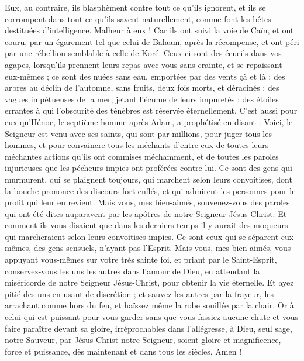 \begin{multicols}{2}
Eux, au contraire, ils blasphèment contre tout ce qu'ils ignorent, et ils se corrompent dans tout ce qu'ils savent naturellement, comme font les bêtes destituées d'intelligence.
Malheur à eux ! Car ils ont suivi la voie de Caïn, et ont couru, par un égarement tel que celui de Balaam, après la récompense, et ont péri par une rébellion semblable à celle de Koré.
Ceux-ci sont des écueils dans vos agapes, lorsqu’ils prennent leurs repas avec vous sans crainte, et se repaissant eux-mêmes ; ce sont des nuées sans eau, emportées par des vents çà et là ; des arbres au déclin de l’automne, sans fruits, deux fois morts, et déracinés ;
des vagues impétueuses de la mer, jetant l'écume de leurs impuretés ; des étoiles errantes à qui l'obscurité des ténèbres est réservée éternellement.
C’est aussi pour eux qu’Hénoc, le septième homme après Adam, a prophétisé en disant :
Voici, le Seigneur est venu avec ses saints, qui sont par millions, pour juger tous les hommes, et pour convaincre tous les méchants d'entre eux de toutes leurs méchantes actions qu'ils ont commises méchamment, et de toutes les paroles injurieuses que les pécheurs impies ont proférées contre lui.
Ce sont des gens qui murmurent, qui se plaignent toujours, qui marchent selon leurs convoitises, dont la bouche prononce des discours fort enflés, et qui admirent les personnes pour le profit qui leur en revient.
Mais vous, mes bien-aimés, souvenez-vous des paroles qui ont été dites auparavent par les apôtres de notre Seigneur Jésus-Christ.
Et comment ils vous disaient que dans les derniers temps il y aurait des moqueurs qui marcheraient selon leurs convoitises impies.
Ce sont ceux qui se séparent eux-mêmes, des gens sensuels, n'ayant pas l'Esprit.
Mais vous, mes bien-aimés, vous appuyant vous-mêmes sur votre très sainte foi, et priant par le Saint-Esprit,
conservez-vous les uns les autres dans l'amour de Dieu, en attendant la miséricorde de notre Seigneur Jésus-Christ, pour obtenir la vie éternelle.
Et ayez pitié des uns en usant de discrétion ;
et sauvez les autres par la frayeur, les arrachant comme hors du feu, et haïssez même la robe souillée par la chair.
Or à celui qui est puissant pour vous garder sans que vous fassiez aucune chute et vous faire paraître devant sa gloire, irréprochables dans l'allégresse,
à Dieu, seul sage, notre Sauveur, par Jésus-Christ notre Seigneur, soient gloire et magnificence, force et puissance, dès maintenant et dans tous les siècles, Amen !
\PPE{}
\end{multicols}
